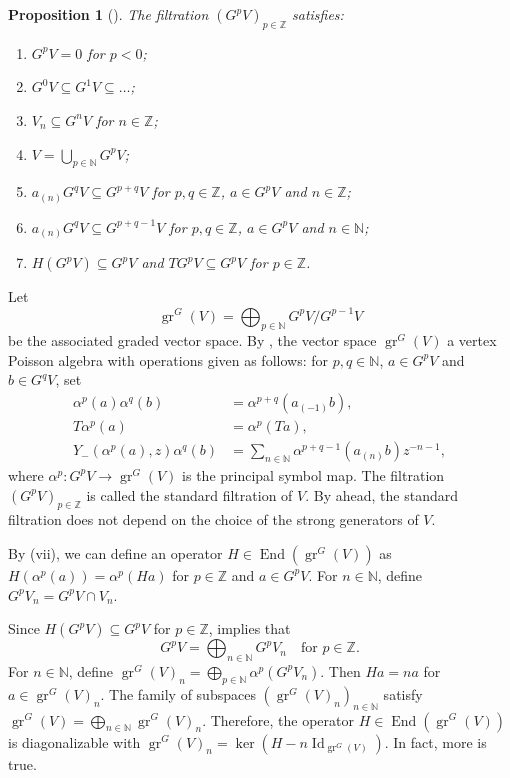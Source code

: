 \documentclass[a4paper, 12pt, reqno]{amsart}
\newtheorem{proposition}[theorem]{Proposition}
\theoremstyle{remark}
\numberwithin{equation}{subsection}
\DeclareMathOperator{\Id}{Id}
\DeclareMathOperator{\gr}{gr}
\DeclareMathOperator{\End}{End}
\begin{document}
\begin{proposition}[{\cite{li_vertex_2004}}]
  \label{prp:8}
  The filtration $(G^pV)_{p \in \mathbb{Z}}$ satisfies:
  \begin{enumerate}
  \item $G^pV = 0$ for $p < 0$;
  \item $G^0V \subseteq G^1V \subseteq \dots$;
  \item $V_n \subseteq G^nV$ for $n \in \mathbb{Z}$;
  \item $V = \bigcup_{p \in \mathbb{N}}G^pV$;
  \item $a_{(n)}G^qV \subseteq G^{p + q}V$ for $p, q \in \mathbb{Z}$, $a \in G^pV$ and $n \in \mathbb{Z}$;
  \item $a_{(n)}G^qV \subseteq G^{p + q - 1}V$ for $p, q \in \mathbb{Z}$, $a \in G^pV$ and $n \in \mathbb{N}$;
  \item $H(G^pV) \subseteq G^pV$ and $TG^pV \subseteq G^pV$ for $p \in \mathbb{Z}$.
  \end{enumerate}
\end{proposition}

Let
\begin{equation*}
  \gr^G(V) = \bigoplus_{p \in \mathbb{N}}G^pV/G^{p - 1}V
\end{equation*}
be the associated graded vector space.
By \cite{li_vertex_2004}, the vector space $\gr^G(V)$ a vertex Poisson algebra with operations given as follows: for $p, q \in \mathbb{N}$, $a \in G^pV$ and $b \in G^qV$, set
\begin{align*}
  \alpha^p(a)\alpha^q(b) &= \alpha^{p + q}(a_{(-1)}b), \\
  T\alpha^p(a) &= \alpha^p(Ta), \\
  Y_-(\alpha^p(a), z)\alpha^q(b) &= \sum_{n \in \mathbb{N}}\alpha^{p + q - 1}(a_{(n)}b)z^{-n - 1},
\end{align*}
where $\alpha^p: G^pV \to \gr^G(V)$ is the principal symbol map.
The filtration $(G^pV)_{p \in \mathbb{Z}}$ is called the standard filtration of $V$.
By  ahead, the standard filtration does not depend on the choice of the strong generators of $V$.

By (vii), we can define an operator $H \in \End(\gr^G(V))$ as $H(\alpha^p(a)) = \alpha^p(Ha)$ for $p \in \mathbb{Z}$ and $a \in G^pV$.
For $n \in \mathbb{N}$, define $G^pV_n = G^pV \cap V_n$.

Since $H(G^pV) \subseteq G^pV$ for $p \in \mathbb{Z}$,  implies that
\begin{equation}
  \label{eq:46}
  G^pV = \bigoplus_{n \in \mathbb{N}}G^pV_n \quad \text{for }p \in \mathbb{Z}.
\end{equation}
For $n \in \mathbb{N}$, define $\gr^G(V)_n = \bigoplus_{p \in \mathbb{N}}\alpha^p(G^pV_n)$.
Then $Ha = na$ for $a \in \gr^G(V)_n$.
The family of subspaces $(\gr^G(V)_n)_{n \in \mathbb{N}}$ satisfy $\gr^G(V) = \bigoplus_{n \in \mathbb{N}} \gr^G(V)_n$.
Therefore, the operator $H \in \End(\gr^G(V))$ is diagonalizable with $\gr^G(V)_n = \ker(H - n\Id_{\gr^G(V)})$.
In fact, more is true.
\end{document}
